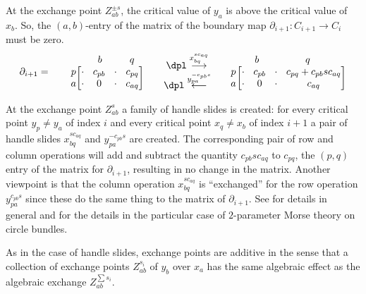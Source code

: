 \documentclass[JEP,XML,SOM,Unicode,NoFloatCountersInSection]{cedram}
\newcommand\To[1]{\mathchoice{\xrightarrow{\textstyle\kern4pt#1\kern3pt}}{\stackrel{#1}{\longrightarrow}}{}{}}
\newcommand\From[1]{\mathchoice{\xleftarrow{\textstyle~#1~}}{\stackrel{#1}{\longleftarrow}}{}{}}
\theoremstyle{plain}
\theoremstyle{definition}
\newcommand{\mat}[1]{\ensuremath{
\left[\begin{matrix}#1
\end{matrix}\right]
}}
\begin{document}
At the exchange point $Z_{ab}^{\pm s}$, the critical value of $y_a$ is above the critical value of~$x_b$. So, the $(a,b)$-entry of the matrix of the boundary map $\partial_{i+1}:C_{i+1}\to C_i$ must be zero.
\[\arraycolsep4.5pt
\partial_{i+1}=\qquad \begin{matrix}\ \\ p\\a
\end{matrix}
\begin{matrix}
\begin{matrix} \ & b\quad & & q\end{matrix}\\
\mat{
\cdot & c_{pb} & \cdot & c_{pq}\\
\cdot & 0 & \cdot & c_{aq}
}
\end{matrix}
\qquad
\begin{matrix}\dpl
\To{x_{bq}^{sc_{aq}}}\\
\dpl\From{y_{pa}^{-c_{pb}s}}
\end{matrix}
\qquad \begin{matrix}\ \\ p\\a
\end{matrix}
\begin{matrix}
\begin{matrix} \quad & b &&& \qquad q &\quad& & \end{matrix}\\
\mat{
\cdot & c_{pb} & \cdot & c_{pq}+c_{pb}sc_{aq}\\
\cdot & 0 & \cdot & c_{aq}
}
\end{matrix}
\]

At the exchange point $Z_{ab}^{s}$ a family of handle slides is created: for every critical point $y_p\neq y_a$ of index $i$ and every critical point $x_q\neq x_b$ of index $i+1$ a pair of handle slides $x_{bq}^{s c_{aq}}$ and $y_{pa}^{-c_{pb}s}$ are created. The corresponding pair of row and column operations will add and subtract the quantity $c_{pb}s c_{aq}$ to $c_{pq}$, the $(p,q)$ entry of the matrix for $\partial_{i+1}$, resulting in no change in the matrix. Another viewpoint is that the column operation $x_{bq}^{s c_{aq}}$ is ``exchanged'' for the row operation $y_{pa}^{c_{pb}s}$ since these do the same thing to the matrix of $\partial_{i+1}$. See \cite{HW73} for details in general and \cite{IK93} for the details in the particular case of $2$-parameter Morse theory on circle bundles.

As in the case of handle slides, exchange points are additive in the sense that a collection of exchange points $Z_{ab}^{s_i}$ of $y_b$ over $x_a$ has the same algebraic effect as the algebraic exchange $Z_{ab}^{\sum s_i}$.
\end{document}
